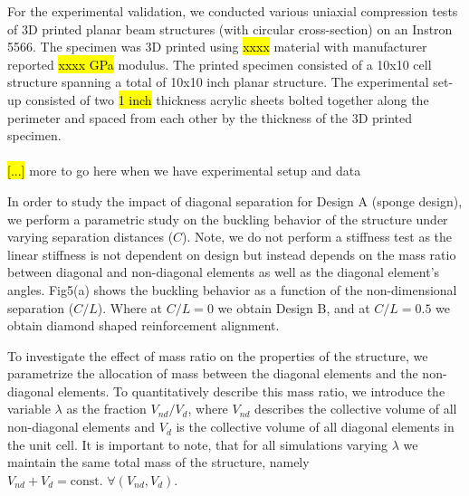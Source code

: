 \documentclass[10pt,twocolumn,twoside]{fernandes_paper}
\newcommand{\mf}[1]{\colorbox{blue!10}{\color{color3}#1}}
\begin{document}
For the experimental validation, we conducted various uniaxial compression tests of 3D printed planar beam structures (with circular cross-section) on an Instron 5566. The specimen was 3D printed using \hl{xxxx} material with manufacturer reported \hl{xxxx GPa} modulus. The printed specimen consisted of a 10x10 cell structure spanning a total of 10x10 inch planar structure. The experimental set-up consisted of two \hl{1 inch} thickness acrylic sheets bolted together along the perimeter and spaced from each other by the thickness of the 3D printed specimen.\\\\\hl{[...]} \mf{more to go here when we have experimental setup and data}

In order to study the impact of diagonal separation for Design A (sponge design), we perform a parametric study on the buckling behavior of the structure under varying separation distances ($C$). Note, we do not perform a stiffness test as the linear stiffness is not dependent on design but instead depends on the mass ratio between diagonal and non-diagonal elements as well as the diagonal element's angles. {Fig5}(a) shows the buckling behavior as a function of the non-dimensional separation ($C/L$). Where at $C/L=0$ we obtain Design B, and at $C/L=0.5$ we obtain diamond shaped reinforcement alignment. 

To investigate the effect of mass ratio on the properties of the structure, we parametrize the allocation of mass between the diagonal elements and the non-diagonal elements. To quantitatively describe this mass ratio, we introduce the variable $\lambda$ as the fraction $V_{nd}/V_d$, where $V_{nd}$ describes the collective volume of all non-diagonal elements and $V_d$ is the collective volume of all diagonal elements in the unit cell. It is important to note, that for all simulations varying $\lambda$ we maintain the same total mass of the structure, namely $V_{nd}+V_d=\mbox{const. } \forall (V_{nd},V_d)$. 






\end{document}
